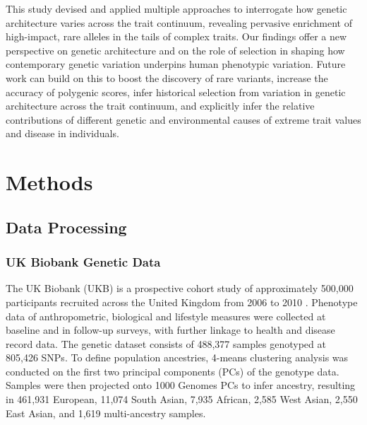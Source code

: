 \documentclass[12pt]{zHenriquesLab-StyleBioRxiv}
\begin{document}
This study devised and applied multiple approaches to interrogate how genetic architecture 
varies across the trait continuum, revealing pervasive enrichment of high-impact, 
rare alleles in the tails of complex traits. Our findings offer a new perspective on 
genetic architecture and on the role of selection in shaping how contemporary genetic 
variation underpins human phenotypic variation. Future work can build on this to boost 
the discovery of rare variants, increase the accuracy of polygenic scores, infer historical 
selection from variation in genetic architecture across the trait continuum, 
and explicitly infer the relative contributions of different genetic and environmental 
causes of extreme trait values and disease in individuals.
%
%
%
%
%
%
%
%
%
%
%
%
%
%
%
%
%
%
%
%
%
%
%
%
%
%
%
%
%
%
%
%
%
%
%
%
%
%
%
%
%
%
%
%
\clearpage \newpage 
\section*{Methods} \label{sec:methods} 
\subsection*{Data Processing} \label{sec:methods:dataProcessing}
\subsubsection*{UK Biobank Genetic Data} 
The UK Biobank (UKB) is a prospective cohort study of approximately
500,000 participants recruited across the United Kingdom from 2006 to
2010 \cite{ukb}. Phenotype data of anthropometric, biological and
lifestyle measures were collected at baseline and in follow-up surveys, with
further linkage to health and disease record data. The genetic dataset
consists of 488,377 samples genotyped at 805,426 SNPs.
To define population ancestries, 4-means clustering analysis was
conducted on the first two principal components (PCs) of the genotype
data. Samples were then projected onto 1000 Genomes PCs to infer
ancestry, resulting in 461,931 European, 11,074 South Asian, 7,935
African, 2,585 West Asian, 2,550 East Asian, and 1,619 multi-ancestry
samples.
\end{document}
